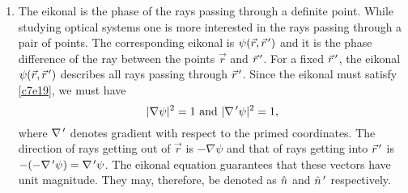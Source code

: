 \begin{enumerate}
\item The eikonal is the phase of the rays passing through a definite point.
While studying optical systems one is more interested in the rays passing
through a pair of points. The corresponding eikonal is $\psi(\vec{r}, 
\vec{r}^{\,\prime})$ and it is the phase difference of the ray between the points
$\vec{r}$ and $\vec{r}^{\,\prime}$. For a fixed $\vec{r}^{\,\prime}$, the eikonal $\psi
(\vec{r}, \vec{r}^{\,\prime})$ describes all rays passing through $\vec{r}^{\,\prime}$. Since
the eikonal must satisfy \eqref{c7e19}, we must have
\begin{equation}\label{c7e20}
|\nabla\psi|^2 = 1 \text{ and } |\nabla^{\,\prime}\psi|^2 = 1,
\end{equation}
where $\nabla^{\,\prime}$ denotes gradient with respect to the primed coordinates. 
The direction of rays getting out of $\vec{r}$ is $-\nabla\psi$ and that of
rays getting into $\vec{r}^{\,\prime}$ is $-(-\nabla^{\,\prime}\psi) = \nabla^{\,\prime}\psi$. The
eikonal equation guarantees that these vectors have unit magnitude. They may,
therefore, be denoted as $\hat{n}$ and $\hat{n}^{\,\prime}$ respectively.


\end{enumerate}
